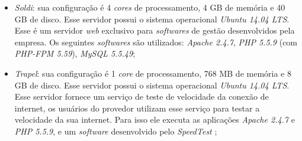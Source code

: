 \begin{itemize}
 \item \textit{Soldi}: sua configuração é 4 \textit{cores} de processamento, 4 GB de memória e 40 GB de disco. Esse servidor possui o 
 sistema operacional \textit{Ubuntu 14.04 \ac{LTS}}. Esse é um servidor \textit{web} exclusivo para \textit{softwares} de gestão desenvolvidos
 pela empresa. Os seguintes \textit{softwares} são utilizados: \textit{Apache 2.4.7}, \textit{\ac{PHP} 5.5.9} (com \textit{PHP-FPM 5.59}), 
 \textit{MySQL 5.5.49};
 
 \item \textit{Trapel}: sua configuração é 1 \textit{core} de processamento, 768 MB de memória e 8 GB de disco. Esse servidor possui o 
 sistema operacional \textit{Ubuntu 14.04 \ac{LTS}}. Esse servidor fornece um serviço de teste de velocidade da conexão de internet, os 
 usuários do provedor utilizam esse serviço para testar a velocidade da sua internet. Para isso ele executa as aplicações \textit{Apache 2.4.7} e
 \textit{\ac{PHP} 5.5.9}, e um \textit{software} desenvolvido pelo \textit{SpeedTest} \cite{speedtest};
\end{itemize}

